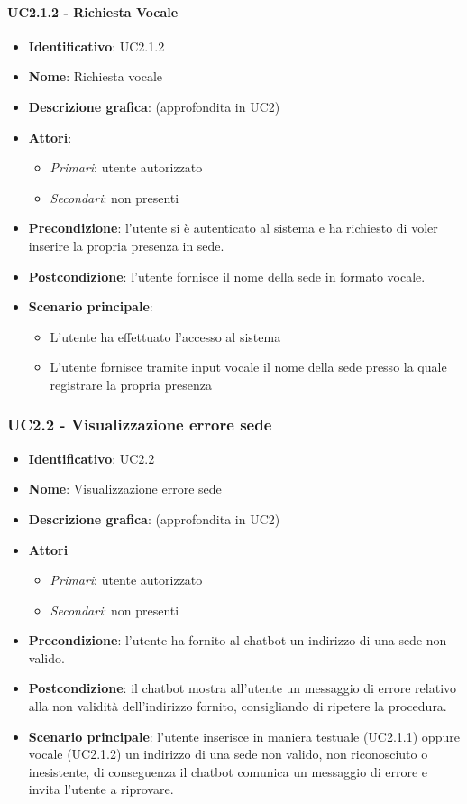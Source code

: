 \paragraph{UC2.1.2 - Richiesta Vocale}
\begin{itemize}
   \item \textbf{Identificativo}: UC2.1.2
   \item \textbf{Nome}: Richiesta vocale
   \item \textbf{Descrizione grafica}: (approfondita in UC2)
   \item \textbf{Attori}:
   \begin{itemize} 
       \item \textit{Primari}: utente autorizzato
       \item \textit{Secondari}: non presenti
   \end{itemize}
       \item \textbf{Precondizione}: l'utente si è autenticato al sistema e ha richiesto di voler inserire la propria presenza in sede. 
       \item \textbf{Postcondizione}: l'utente fornisce il nome della sede in formato vocale. 
    \item \textbf{Scenario principale}: 
       \begin{itemize}
           \item L'utente ha effettuato l'accesso al sistema 
           \item L'utente fornisce tramite input vocale il nome della sede presso la quale registrare la propria presenza
       \end{itemize}
\end{itemize}

\subsubsection{UC2.2 - Visualizzazione errore sede}
\begin{itemize}
    \item \textbf{Identificativo}: UC2.2
    \item \textbf{Nome}: Visualizzazione errore sede
    \item \textbf{Descrizione grafica}: (approfondita in UC2)
    \item \textbf{Attori}
 \begin{itemize} 
    \item \textit{Primari}: utente autorizzato
    \item \textit{Secondari}: non presenti
 \end{itemize}
 \item \textbf{Precondizione}: l'utente ha fornito al chatbot un indirizzo di una sede non valido.
 \item \textbf{Postcondizione}: il chatbot mostra all'utente un messaggio di errore relativo alla non validità dell'indirizzo fornito, consigliando di ripetere la procedura. 
 \item \textbf{Scenario principale}: l'utente inserisce in maniera testuale (UC2.1.1) oppure vocale (UC2.1.2) un indirizzo di una sede non valido, non riconosciuto o inesistente, di conseguenza il chatbot comunica un messaggio di errore e invita l'utente a riprovare. 
\end{itemize}
\newpage